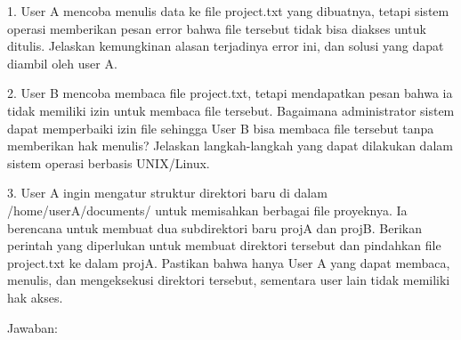 \documentclass[12pt]{article}
\begin{document}
1. User A mencoba menulis data ke file project.txt yang dibuatnya, tetapi sistem operasi memberikan pesan error bahwa file tersebut tidak bisa diakses untuk ditulis. Jelaskan kemungkinan alasan terjadinya error ini, dan solusi yang dapat diambil oleh user A.
   
2. User B mencoba membaca file project.txt, tetapi mendapatkan pesan bahwa ia tidak memiliki izin untuk membaca file tersebut. Bagaimana administrator sistem dapat memperbaiki izin file sehingga User B bisa membaca file tersebut tanpa memberikan hak menulis? Jelaskan langkah-langkah yang dapat dilakukan dalam sistem operasi berbasis UNIX/Linux.

3. User A ingin mengatur struktur direktori baru di dalam /home/userA/documents/ untuk memisahkan berbagai file proyeknya. Ia berencana untuk membuat dua subdirektori baru projA dan projB. Berikan perintah yang diperlukan untuk membuat direktori tersebut dan pindahkan file project.txt ke dalam projA. Pastikan bahwa hanya User A yang dapat membaca, menulis, dan mengeksekusi direktori tersebut, sementara user lain tidak memiliki hak akses.

Jawaban:
\end{document}
